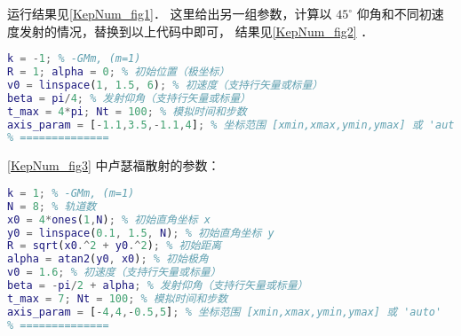 运行结果见\autoref{KepNum_fig1}． 这里给出另一组参数，计算以 $45^\circ$ 仰角和不同初速度发射的情况，替换到以上代码中即可， 结果见\autoref{KepNum_fig2} ．
\begin{lstlisting}[language=matlab]
% === 参数设置 ===
k = -1; % -GMm, (m=1)
R = 1; alpha = 0; % 初始位置（极坐标）
v0 = linspace(1, 1.5, 6); % 初速度（支持行矢量或标量）
beta = pi/4; % 发射仰角（支持行矢量或标量）
t_max = 4*pi; Nt = 100; % 模拟时间和步数
axis_param = [-1.1,3.5,-1.1,4]; % 坐标范围 [xmin,xmax,ymin,ymax] 或 'auto'
% ==============
\end{lstlisting}

\autoref{KepNum_fig3} 中卢瑟福散射的参数：
\begin{lstlisting}[language=matlab]
% === 参数设置 ===
k = 1; % -GMm, (m=1)
N = 8; % 轨道数
x0 = 4*ones(1,N); % 初始直角坐标 x
y0 = linspace(0.1, 1.5, N); % 初始直角坐标 y
R = sqrt(x0.^2 + y0.^2); % 初始距离
alpha = atan2(y0, x0); % 初始极角
v0 = 1.6; % 初速度（支持行矢量或标量）
beta = -pi/2 + alpha; % 发射仰角（支持行矢量或标量）
t_max = 7; Nt = 100; % 模拟时间和步数
axis_param = [-4,4,-0.5,5]; % 坐标范围 [xmin,xmax,ymin,ymax] 或 'auto'
% ==============
\end{lstlisting}
